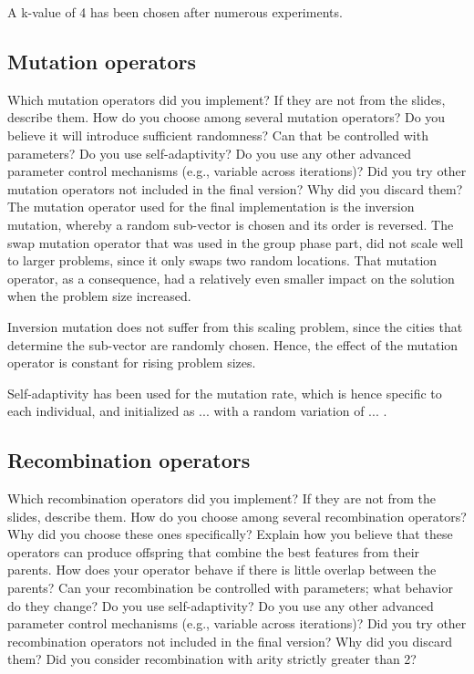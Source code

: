\documentclass[a4paper,10pt]{article}
\newcommand{\ReplaceMe}[1]{{\color{blue}#1}}
\begin{document}
A k-value of 4 %
has been chosen after numerous experiments.

\subsection{Mutation operators}
\label{mutation}
\ReplaceMe{Which mutation operators did you implement? If they are not from the slides, describe them. How do you choose among several mutation operators? Do you believe it will introduce sufficient randomness? Can that be controlled with parameters? Do you use self-adaptivity? Do you use any other advanced parameter control mechanisms (e.g., variable across iterations)? Did you try other mutation operators not included in the final version? Why did you discard them?}
The mutation operator used for the final implementation is the inversion mutation, whereby a random sub-vector is chosen and its order is reversed. The swap mutation operator that was used in the group phase part, did not scale well to larger problems, since it only swaps two random locations. That mutation operator, as a consequence, had a relatively even smaller impact on the solution when the problem size increased.

Inversion mutation does not suffer from this scaling problem, since the cities that determine the sub-vector are randomly chosen. Hence, the effect of the mutation operator is constant for rising problem sizes.  

Self-adaptivity has been used for the mutation rate, which is hence specific to each individual, and initialized as ... %
with a random variation of ... %
.

\subsection{Recombination operators}
\label{recombination}
\ReplaceMe{Which recombination operators did you implement? If they are not from the slides, describe them. How do you choose among several recombination operators? Why did you choose these ones specifically? Explain how you believe that these operators can produce offspring that combine the best features from their parents. How does your operator behave if there is little overlap between the parents? Can your recombination be controlled with parameters; what behavior do they change? Do you use self-adaptivity? Do you use any other advanced parameter control mechanisms (e.g., variable across iterations)? Did you try other recombination operators not included in the final version? Why did you discard them? Did you consider recombination with arity strictly greater than 2?}
\end{document}
